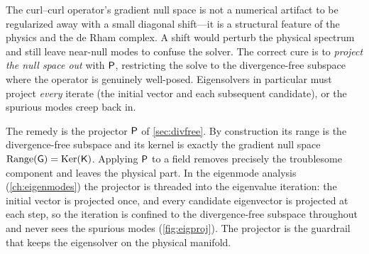 \begin{pitfall}
The curl--curl operator's gradient null space is not a numerical artifact to be
regularized away with a small diagonal shift---it is a structural feature of the
physics and the de Rham complex. A shift would perturb the physical spectrum and
still leave near-null modes to confuse the solver. The correct cure is to
\emph{project the null space out} with $\mathsf{P}$, restricting the solve to the
divergence-free subspace where the operator is genuinely well-posed. Eigensolvers
in particular must project \emph{every} iterate (the initial vector and each
subsequent candidate), or the spurious modes creep back in.
\end{pitfall}

The remedy is the projector $\mathsf{P}$ of \cref{sec:divfree}. By construction its
range is the divergence-free subspace and its kernel is exactly the gradient null
space $\mathrm{Range}(\mathsf{G})=\mathrm{Ker}(\mathsf{K})$. Applying $\mathsf{P}$ to a
field removes precisely the troublesome component and leaves the physical part. In
the eigenmode analysis (\cref{ch:eigenmodes}) the projector is threaded into the
eigenvalue iteration: the initial vector is projected once, and every candidate
eigenvector is projected at each step, so the iteration is confined to the
divergence-free subspace throughout and never sees the spurious modes
(\cref{fig:eigproj}). The projector is the guardrail that keeps the eigensolver on
the physical manifold.

